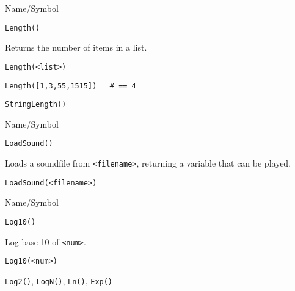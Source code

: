 \begin{desc}{Name/Symbol}
\item[Name/Symbol]	\verb+Length()+

\item[Description]	Returns the number of items in a list.

\item[Usage]
\begin{verbatim}
Length(<list>)
\end{verbatim}

\item[Example]
\begin{verbatim}
Length([1,3,55,1515])	# == 4
\end{verbatim}

\item[See Also]	\verb+StringLength()+
\end{desc}


\begin{desc}{Name/Symbol}
\item[Name/Symbol]	\verb+LoadSound()+

\item[Description]	Loads a soundfile from \verb+<filename>+, 
		returning a variable that can be played.

\item[Usage]
\begin{verbatim}
LoadSound(<filename>)
\end{verbatim}

\item[Example]	

\item[See Also]	
\end{desc}


\begin{desc}{Name/Symbol}
\item[Name/Symbol]	\verb+Log10()+

\item[Description]	Log base 10 of \verb+<num>+.

\item[Usage]
\begin{verbatim}
Log10(<num>)
\end{verbatim}

\item[Example]	

\item[See Also]	\verb+Log2()+, \verb+LogN()+, \verb+Ln()+, \verb+Exp()+
\end{desc}

